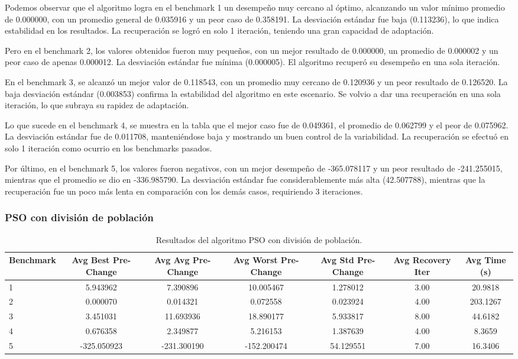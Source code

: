 \documentclass[10pt]{article}
\begin{document}
Podemos observar que el algoritmo logra en el benchmark 1 un desempeño muy cercano al óptimo, alcanzando un valor mínimo promedio de 0.000000, con un promedio general de 0.035916 y un peor caso de 0.358191. La desviación estándar fue baja (0.113236), lo que indica estabilidad en los resultados. La recuperación se logró en solo 1 iteración, teniendo una gran capacidad de adaptación.

Pero en el benchmark 2, los valores obtenidos fueron muy pequeños, con un mejor resultado de 0.000000, un promedio de 0.000002 y un peor caso de apenas 0.000012. La desviación estándar fue mínima (0.000005). El algoritmo recuperó su desempeño en una sola iteración.

En el benchmark 3, se alcanzó un mejor valor de 0.118543, con un promedio muy cercano de 0.120936 y un peor resultado de 0.126520. La baja desviación estándar (0.003853) confirma la estabilidad del algoritmo en este escenario. Se volvio a dar una recuperación en una sola iteración, lo que subraya su rapidez de adaptación.

Lo que sucede en el benchmark 4, se muestra en la tabla que el mejor caso fue de 0.049361, el promedio de 0.062799 y el peor de 0.075962. La desviación estándar fue de 0.011708, manteniéndose baja y mostrando un buen control de la variabilidad. La recuperación se efectuó en solo 1 iteración como ocurrio en los benchmarks pasados.

Por último, en el benchmark 5, los valores fueron negativos, con un mejor desempeño de -365.078117 y un peor resultado de -241.255015, mientras que el promedio se dio en -336.985790. La desviación estándar fue considerablemente más alta (42.507788), mientras que la recuperación fue un poco más lenta en comparación con los demás casos, requiriendo 3 iteraciones.



\subsubsection*{PSO con división de población}
\begin{table}[H]
\centering
\caption{Resultados del algoritmo PSO con división de población.}
\label{tab:pso-dividido}
\scriptsize
\begin{tabular}{lcccccc}
\toprule
\textbf{Benchmark} & \textbf{Avg Best Pre-Change} & \textbf{Avg Avg Pre-Change} & \textbf{Avg Worst Pre-Change} & \textbf{Avg Std Pre-Change} & \textbf{Avg Recovery Iter} & \textbf{Avg Time (s)} \\
\midrule
1 & 5.943962 & 7.390896 & 10.005467 & 1.278012 & 3.00 & 20.9818 \\
2 & 0.000070 & 0.014321 & 0.072558 & 0.023924 & 4.00 & 203.1267 \\
3 & 3.451031 & 11.693936 & 18.890177 & 5.933817 & 8.00 & 44.6182 \\
4 & 0.676358 & 2.349877 & 5.216153 & 1.387639 & 4.00 & 8.3659 \\
5 & -325.050923 & -231.300190 & -152.200474 & 54.129551 & 7.00 & 16.3406 \\
\bottomrule
\end{tabular}
\end{table}
\end{document}
